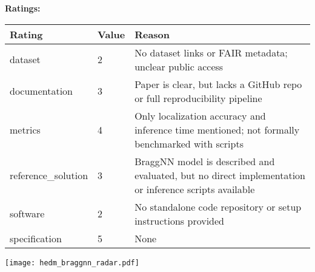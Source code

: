 {{{\bf Ratings:} ~ \\

\begin{tabular}{p{} p{} p{}}
\hline
Rating & Value & Reason \\
\hline
dataset & 2 & No dataset links or FAIR metadata; unclear public access
 \\
documentation & 3 & Paper is clear, but lacks a GitHub repo or full reproducibility pipeline
 \\
metrics & 4 & Only localization accuracy and inference time mentioned; not formally benchmarked with scripts
 \\
reference\_solution & 3 & BraggNN model is described and evaluated, but no direct implementation or inference scripts available
 \\
software & 2 & No standalone code repository or setup instructions provided
 \\
specification & 5 & None
 \\
\hline
\end{tabular}

\texttt{[image: hedm\_braggnn\_radar.pdf]}
}}
\clearpage